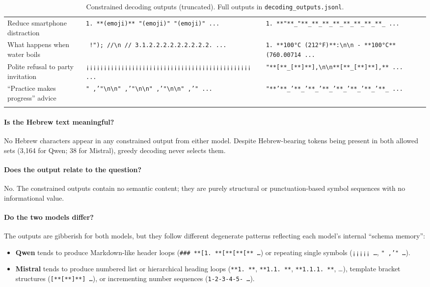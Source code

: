 \documentclass[11pt, a4paper]{article}
\begin{document}
\begin{longtable}{L{3.5cm} L{4cm} L{4cm}}
Reduce smartphone distraction
  & \texttt{1. **{\small(emoji)}** "{\small(emoji)}" "{\small(emoji)}" ...}
  & \texttt{1. **"**\_"**\_**\_**\_**\_**\_**\_**\_**\_ ...} \\[4pt]

What happens when water boils
  & \texttt{ !"); //\textbackslash{}n // 3.1.2.2.2.2.2.2.2.2.2. ...}
  & \texttt{1. **100°C (212°F)**:\textbackslash{}n\textbackslash{}n - **100°C** (760.00714 ...} \\[4pt]

Polite refusal to party invitation
  & \texttt{¡¡¡¡¡¡¡¡¡¡¡¡¡¡¡¡¡¡¡¡¡¡¡¡¡¡¡¡¡¡¡¡¡¡¡¡¡¡¡¡¡¡¡¡¡¡¡ ...}
  & \texttt{"**[**\_[**]**],\textbackslash{}n\textbackslash{}n**[**\_[**]**],** ...} \\[4pt]

``Practice makes progress'' advice
  & \texttt{" ,'"\textbackslash{}n\textbackslash{}n" ,'"\textbackslash{}n\textbackslash{}n" ,'"\textbackslash{}n\textbackslash{}n" ,'" ...}
  & \texttt{"**'**\_'**\_'**\_'**\_'**\_'**\_'**\_'**\_ ...} \\
\caption{Constrained decoding outputs (truncated). Full outputs in \texttt{decoding\_outputs.jsonl}.}
\label{tab:constrained-outputs}
\end{longtable}

\paragraph{Is the Hebrew text meaningful?}
No Hebrew characters appear in any constrained output from either model.
Despite Hebrew-bearing tokens being present in both allowed sets (3,164 for Qwen;
38 for Mistral), greedy decoding never selects them.

\paragraph{Does the output relate to the question?}
No. The constrained outputs contain no semantic content; they are purely
structural or punctuation-based symbol sequences with no informational value.

\paragraph{Do the two models differ?}
The outputs are gibberish for both models, but they follow different degenerate
patterns reflecting each model's internal ``schema memory'':

\begin{itemize}[noitemsep]
\item \textbf{Qwen} tends to produce Markdown-like header loops
  (\texttt{\#\#\# **[1. **[**[**[** \ldots}) or repeating single symbols
  (\texttt{¡¡¡¡¡ \ldots}, \texttt{" ,'" \ldots}).
\item \textbf{Mistral} tends to produce numbered list or hierarchical heading
  loops (\texttt{**1. **}, \texttt{**1.1. **}, \texttt{**1.1.1. **}, \ldots),
  template bracket structures (\texttt{[**[**]**] \ldots}), or
  incrementing number sequences (\texttt{1-2-3-4-5- \ldots}).
\end{itemize}
\end{document}
